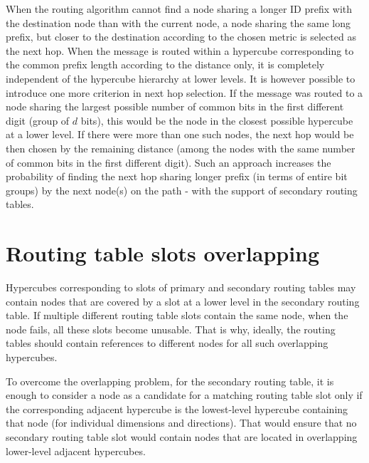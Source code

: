 When the routing algorithm cannot find a node sharing a longer ID prefix with the destination node than with the current node, a node sharing the same long prefix, but closer to the destination according to the chosen metric is selected as the next hop. When the message is routed within a hypercube corresponding to the common prefix length according to the distance only, it is completely independent of the hypercube hierarchy at lower levels. It is however possible to introduce one more criterion in next hop selection. If the message was routed to a node sharing the largest possible number of common bits in the first different digit (group of $d$ bits), this would be the node in the closest possible hypercube at a lower level. If there were more than one such nodes, the next hop would be then chosen by the remaining distance (among the nodes with the same number of common bits in the first different digit). Such an approach increases the probability of finding the next hop sharing longer prefix (in terms of entire bit groups) by the next node(s) on the path - with the support of secondary routing tables.






\section{Routing table slots overlapping}
\label{sec:rtOverlapping}

Hypercubes corresponding to slots of primary and secondary routing tables may contain nodes that are covered by a slot at a lower level in the secondary routing table. If multiple different routing table slots contain the same node, when the node fails, all these slots become unusable. That is why, ideally, the routing tables should contain references to different nodes for all such overlapping hypercubes.

To overcome the overlapping problem, for the secondary routing table, it is enough to consider a node as a candidate for a matching routing table slot only if the corresponding adjacent hypercube is the lowest-level hypercube containing that node (for individual dimensions and directions). That would ensure that no secondary routing table slot would contain nodes that are located in overlapping lower-level adjacent hypercubes.

